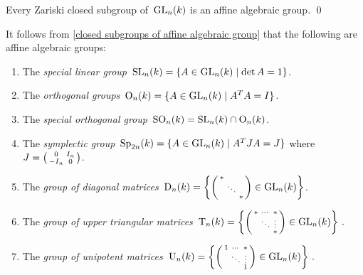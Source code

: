 \begin{corollary}
  \label{closed subgroups of affine algebraic group}
  Every Zariski closed subgroup of~$\operatorname{GL}_n(k)$ is an affine algebraic group.
  \qed
\end{corollary}


\begin{example}
  It follows from \cref{closed subgroups of affine algebraic group} that the following are affine algebraic groups:
  \begin{enumerate}
    \item
      The \emph{special linear group}~$\SL_n(k) = \{ A \in \GL_n(k) \suchthat \det A = 1 \}$.
    \item
      The \emph{orthogonal groups}~$\Orth_n(k) = \{ A \in \GL_n(k) \suchthat A^T A = I \}$.
    \item
      The \emph{special orthogonal group}~$\operatorname{SO}_n(k) = \operatorname{SL}_n(k) \cap \operatorname{O}_n(k)$.
    \item
      The \emph{symplectic group}~$\Symp_{2n}(k) = \{ A \in \GL_n(k) \suchthat A^T J A = J \}$ where~$
          J
        = \begin{psmallmatrix}
             0    & I_n \\
            -I_n  & 0
          \end{psmallmatrix}
      $.
    \item
      The \emph{group of diagonal matrices}~$
          \operatorname{D}_n(k)
        = \left\{
            \begin{psmallmatrix}
              * &        &    \\
                & \ddots &    \\
                &        & *
            \end{psmallmatrix}
            \in \operatorname{GL}_n(k)
          \right\}
      $.
    \item
      The \emph{group of upper triangular matrices}~$
          \operatorname{T}_n(k)
        = \left\{
            \begin{psmallmatrix}
              * & \cdots & *      \\
                & \ddots & \vdots \\
                &        & *
            \end{psmallmatrix}
            \in \operatorname{GL}_n(k)
          \right\} \,.
      $
    \item
      The \emph{group of unipotent matrices}~$
          \operatorname{U}_n(k)
        = \left\{
            \begin{psmallmatrix}
              1 & \cdots & *      \\
                & \ddots & \vdots \\
                &        & 1
            \end{psmallmatrix}
            \in \operatorname{GL}_n(k)
          \right\} \,.
      $
  \end{enumerate}
\end{example}


